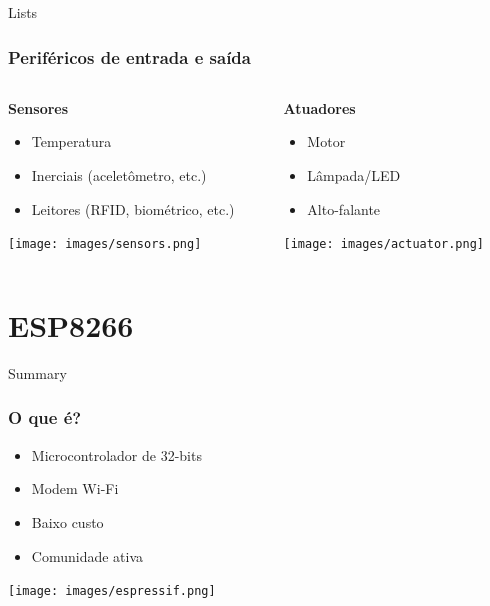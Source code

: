 \documentclass[10pt, compress]{beamer}
\begin{document}
\begin{frame}{Lists}
\frametitle{Periféricos de entrada e saída}
  \begin{columns}
    \begin{column}{0.48\textwidth}
      \begin{center}
        \textbf{Sensores}
        \begin{itemize}
          \item Temperatura
          \item Inerciais (aceletômetro, etc.)
          \item Leitores (RFID, biométrico, etc.)\\
        \end{itemize}
        \vspace{30pt}
        \texttt{[image: images/sensors.png]}\\
      \end{center}
    \end{column}
    \begin{column}{0.48\textwidth}
      \begin{center}
        \textbf{Atuadores}
        \begin{itemize}
          \item Motor
          \item Lâmpada/LED
          \item Alto-falante\\
        \end{itemize}
        \vspace{30pt}
        \texttt{[image: images/actuator.png]}\\
      \end{center}
    \end{column}
  \end{columns}
\end{frame}

\section{ESP8266}

\begin{frame}{Summary}
  \frametitle{O que é?}
  \begin{center}
  \begin{itemize}
    \item Microcontrolador de 32-bits
    \item Modem Wi-Fi
    \item Baixo custo
    \item Comunidade ativa
  \end{itemize}
  \texttt{[image: images/espressif.png]}\\
  \end{center}
\end{frame}
\end{document}
